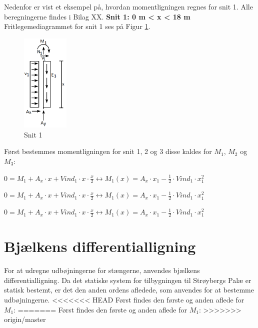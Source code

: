 Nedenfor er vist et eksempel på, hvordan momentligningen regnes for snit 1. Alle beregningerne findes i Bilag XX.
\newline
\newline
\textbf{Snit 1: 0 m < x < 18 m}
\newline
Fritlegemediagrammet for snit 1 ses på Figur \ref{fig:snitetan}.
\begin{figure}[H]
	\centering
	\includegraphics[width=0.2\textwidth]{billeder/asnitet.png}
	\caption{Snit 1}
	\label{fig:snitetan}
\end{figure}


Først bestemmes momentligningen for snit 1, 2 og 3 disse kaldes for $M_1$, $M_2$ og $M_3$:
\begin{center}
	$0 = M_1 + A_x \cdot x + Vind_1\cdot x\cdot \frac{x}{2} \leftrightarrow M_1(x) = A_x\cdot x_1 -\frac{1}{2}\cdot Vind_1 \cdot x_1^2$
\end{center}

\begin{center}
	$0 = M_1 + A_x \cdot x + Vind_1\cdot x\cdot \frac{x}{2} \leftrightarrow M_1(x) = A_x\cdot x_1 -\frac{1}{2}\cdot Vind_1 \cdot x_1^2$
\end{center}

\begin{center}
	$0 = M_1 + A_x \cdot x + Vind_1\cdot x\cdot \frac{x}{2} \leftrightarrow M_1(x) = A_x\cdot x_1 -\frac{1}{2}\cdot Vind_1 \cdot x_1^2$
\end{center}

\section{Bjælkens differentialligning}
For at udregne udbøjningerne for stængerne, anvendes bjælkens differentialligning. Da det statiske system for tilbygningen til Strøybergs Palæ er statisk bestemt, er det den anden ordens afledede, som anvendes for at bestemme udbøjningerne.
\newline
<<<<<<< HEAD
Først findes den første og anden aflede for $M_1$: 
=======
Først findes den første og anden aflede for $M_1$: %
>>>>>>> origin/master
 
